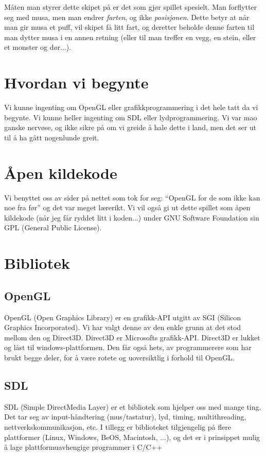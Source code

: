 \documentclass[11pt, dvips]{report}
\begin{document}
Måten man styrer dette skipet på er det som gjør spillet spesielt. Man
forflytter seg med musa, men man endrer \emph{farten}, og ikke
\emph{posisjonen}. Dette betyr at når man gir musa et puff, vil skipet
få litt fart, og deretter beholde denne farten til man dytter musa i
en annen retning (eller til man treffer en vegg, en stein, eller et
monster og dør...).

\section{Hvordan vi begynte}

Vi kunne ingenting om OpenGL eller grafikkprogrammering i det hele
tatt da vi begynte. Vi kunne heller ingenting om SDL eller
lydprogrammering. Vi var mao ganske nervøse, og ikke sikre på om vi
greide å hale dette i land, men det ser ut til å ha gått nogenlunde
greit.

\section{Åpen kildekode}

Vi benyttet oss av sider på nettet som tok for seg: ``OpenGL for de som
ikke kan noe fra før'' og det var meget lærerikt. Vi vil også gi ut
dette spillet som åpen kildekode (når jeg får ryddet litt i koden...)
under GNU Software Foundation sin GPL (General Public License).

\section{Bibliotek}

\subsection{OpenGL}

OpenGL (Open Graphics Library) er en grafikk-API utgitt av SGI
(Silicon Graphics Incorporated). Vi har valgt denne av den enkle grunn
at det stod mellom den og Direct3D. Direct3D er Microsofts
grafikk-API. Direct3D er lukket og låst til windows-plattformen. Den
får også hets, av programmerere som har brukt begge deler, for å være
rotete og uoversiktlig i forhold til OpenGL.

\subsection{SDL}

SDL (Simple DirectMedia Layer) er et bibliotek som hjelper oss med
mange ting. Det tar seg av input-håndtering (mus/tastatur), lyd,
timing, multithreading, nettverkskommunikasjon, etc. I tillegg er
biblioteket tilgjengelig på flere plattformer (Linux, Windows, BeOS,
Macintosh, ...), og det er i prinsippet mulig å lage
plattformuavhengige programmer i C/C++
\end{document}
